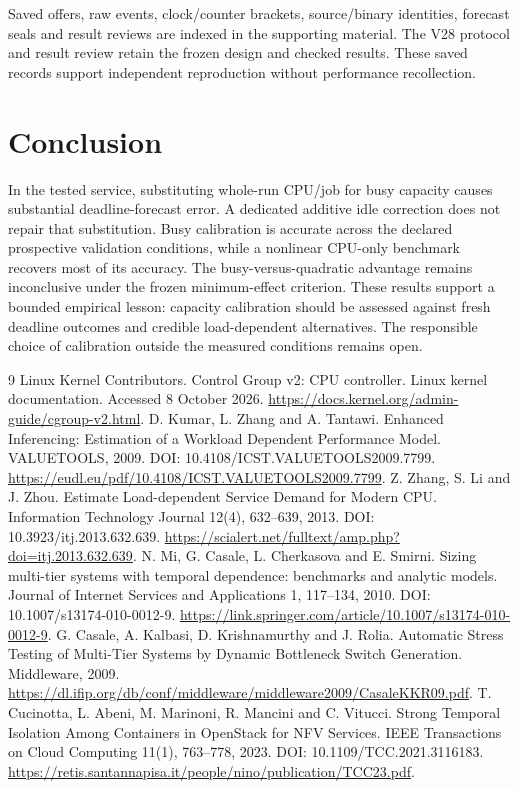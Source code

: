 \documentclass[11pt,a4paper]{article}
\begin{document}
Saved offers, raw events, clock/counter brackets, source/binary identities,
forecast seals and result reviews are indexed in the
supporting material. The
V28 protocol and
result review
retain the frozen design and checked results. These saved records support independent reproduction without performance recollection.

\section{Conclusion}

In the tested service, substituting whole-run CPU/job for busy capacity causes
substantial deadline-forecast error. A dedicated additive idle correction does
not repair that substitution. Busy calibration is accurate across the declared
prospective validation conditions, while a nonlinear CPU-only benchmark recovers
most of its accuracy. The busy-versus-quadratic advantage remains inconclusive
under the frozen minimum-effect criterion. These results support a bounded
empirical lesson: capacity calibration should be assessed against fresh deadline
outcomes and credible load-dependent alternatives. The responsible choice of
calibration outside the measured conditions remains open.

\begin{thebibliography}{9}
 Linux Kernel Contributors. Control Group v2: CPU controller. Linux kernel documentation. Accessed 8 October 2026. \url{https://docs.kernel.org/admin-guide/cgroup-v2.html}.
 D. Kumar, L. Zhang and A. Tantawi. Enhanced Inferencing: Estimation of a Workload Dependent Performance Model. VALUETOOLS, 2009. DOI: 10.4108/ICST.VALUETOOLS2009.7799. \url{https://eudl.eu/pdf/10.4108/ICST.VALUETOOLS2009.7799}.
 Z. Zhang, S. Li and J. Zhou. Estimate Load-dependent Service Demand for Modern CPU. Information Technology Journal 12(4), 632–639, 2013. DOI: 10.3923/itj.2013.632.639. \url{https://scialert.net/fulltext/amp.php?doi=itj.2013.632.639}.
 N. Mi, G. Casale, L. Cherkasova and E. Smirni. Sizing multi-tier systems with temporal dependence: benchmarks and analytic models. Journal of Internet Services and Applications 1, 117–134, 2010. DOI: 10.1007/s13174-010-0012-9. \url{https://link.springer.com/article/10.1007/s13174-010-0012-9}.
 G. Casale, A. Kalbasi, D. Krishnamurthy and J. Rolia. Automatic Stress Testing of Multi-Tier Systems by Dynamic Bottleneck Switch Generation. Middleware, 2009. \url{https://dl.ifip.org/db/conf/middleware/middleware2009/CasaleKKR09.pdf}.
 T. Cucinotta, L. Abeni, M. Marinoni, R. Mancini and C. Vitucci. Strong Temporal Isolation Among Containers in OpenStack for NFV Services. IEEE Transactions on Cloud Computing 11(1), 763–778, 2023. DOI: 10.1109/TCC.2021.3116183. \url{https://retis.santannapisa.it/people/nino/publication/TCC23.pdf}.
\end{thebibliography}
\end{document}
